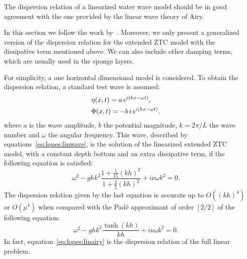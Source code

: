 The dispersion relation  of a
linearized water wave model should be in good agreement with
the one provided by the linear wave theory of Airy.


In this section we follow the work by~\cite{DutykhDias2007}.
Moreover, we only present a generalized version of the
dispersion relation for the extended ZTC model with the
dissipative term mentioned above.  We can also include other
damping terms, which are usually used in the sponge layers.

For simplicity, a one horizontal dimensional model is considered.  To
obtain the dispersion relation, a standard test wave is
assumed:
\begin{subequations}\label{eq:lopes:linwave}
\begin{align}
&\eta(x,t)=a\,e^{i(kx-\omega
  t)},\vspace{0.3cm}\\
&\Phi(x,t)=-b\,i\,e^{i(kx-\omega t)},
\end{align}
\end{subequations}
where $a$ is the wave amplitude, $b$ the potential
magnitude, $k=2\pi/L$ the wave number and $\omega$ the
angular frequency.  This wave, described by
equations~\eqref{eq:lopes:linwave}, is the solution of the
linearized extended ZTC model, with a constant depth bottom and an
extra dissipative term, if the following equation is
satisfied:
\begin{equation}\label{eq:lopes:dissdisp}
\omega^2-ghk^2\frac{1+\frac{1}{15}(kh)^2}{1+\frac{2}{5}(kh)^2}+i\nu\omega
k^2=0.
\end{equation}
The dispersion relation given by the last equation is
accurate up to $O((kh)^4)$ or $O(\mu^4)$ when compared with
the Pad\'{e} approximant of order $[2/2]$ of the following
equation:
\begin{equation}\label{eq:lopes:linairy}
\omega^2-ghk^2\frac{\tanh(kh)}{kh}+i\nu\omega k^2=0.
\end{equation}
In fact, equation~\eqref{eq:lopes:linairy} is the dispersion
relation of the full linear problem.

